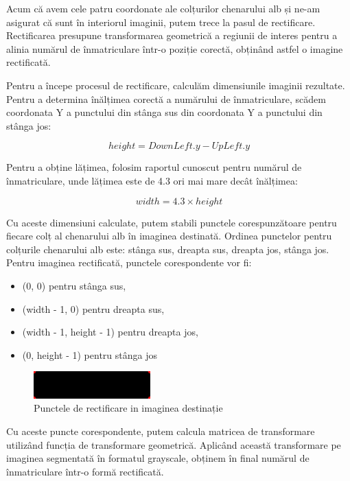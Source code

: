 \documentclass[a4paper,12pt]{report}
\begin{document}
Acum că avem cele patru coordonate ale colțurilor chenarului alb și ne-am asigurat că sunt în interiorul imaginii, putem trece la pasul de rectificare. Rectificarea presupune transformarea geometrică a regiunii de interes pentru a alinia numărul de înmatriculare într-o poziție corectă, obținând astfel o imagine rectificată.

Pentru a începe procesul de rectificare, calculăm dimensiunile imaginii rezultate. Pentru a determina înălțimea corectă a numărului de înmatriculare, scădem coordonata Y a punctului din stânga sus din coordonata Y a punctului din stânga jos:

\[
    height = DownLeft.y - UpLeft.y
\]

Pentru a obține lățimea, folosim raportul cunoscut pentru numărul de înmatriculare, unde lățimea este de 4.3 ori mai mare decât înălțimea:

\[
    width = 4.3 \times height
\]

Cu aceste dimensiuni calculate, putem stabili punctele corespunzătoare pentru fiecare colț al chenarului alb în imaginea destinată. Ordinea punctelor pentru colțurile chenarului alb este: stânga sus, dreapta sus, dreapta jos, stânga jos. Pentru imaginea rectificată, punctele corespondente vor fi:

\begin{itemize}[itemsep=5pt, parsep=0pt]
    \item (0, 0) pentru stânga sus,
    \item (width - 1, 0) pentru dreapta sus,
    \item (width - 1, height - 1) pentru dreapta jos,
    \item (0, height - 1) pentru stânga jos
\end{itemize}

\begin{figure}[h]
    \centering
    \includegraphics[width=0.4\textwidth]{images/points_on_black.jpg}
    \caption{Punctele de rectificare in imaginea destinație}
\end{figure}
\FloatBarrier

Cu aceste puncte corespondente, putem calcula matricea de transformare utilizând funcția de transformare geometrică. Aplicând această transformare pe imaginea segmentată în formatul grayscale, obținem în final numărul de înmatriculare într-o formă rectificată.
\end{document}
